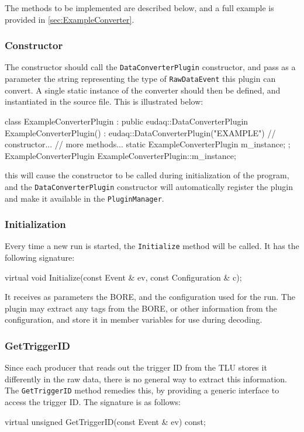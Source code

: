 The methods to be implemented are described below,
and a full example is provided in \autoref{sec:ExampleConverter}.

\subsubsection{Constructor}
The constructor should call the \texttt{DataConverterPlugin} constructor, and pass as a parameter the
string representing the type of \texttt{RawDataEvent} this plugin can convert.
A single static instance of the converter should then be defined,
and instantiated in the source file.
This is illustrated below:
\begin{listing}[C++]
class ExampleConverterPlugin : public eudaq::DataConverterPlugin {
  ExampleConverterPlugin() : eudaq::DataConverterPlugin("EXAMPLE") {
    // constructor...
  }
  // more methods...
  static ExampleConverterPlugin m_instance;
};
ExampleConverterPlugin ExampleConverterPlugin::m_instance;
\end{listing}

this will cause the constructor to be called during initialization of the program,
and the \texttt{DataConverterPlugin} constructor will automatically register the plugin
and make it available in the \texttt{PluginManager}.

\subsubsection{Initialization}
Every time a new run is started, the \texttt{Initialize} method will be called.
It has the following signature:
\begin{listing}
virtual void Initialize(const Event & ev, const Configuration & c);
\end{listing}

It receives as parameters the \gls{BORE}, and the configuration used for the run.
The plugin may extract any tags from the \gls{BORE}, or other information from the configuration,
and store it in member variables for use during decoding.

\subsubsection{GetTriggerID}
Since each producer that reads out the trigger ID from the \gls{TLU} stores it differently in the raw data,
there is no general way to extract this information.
The \texttt{GetTriggerID} method remedies this, by providing a generic interface to access the trigger ID.
The signature is as follows:
\begin{listing}
virtual unsigned GetTriggerID(const Event & ev) const;
\end{listing}

